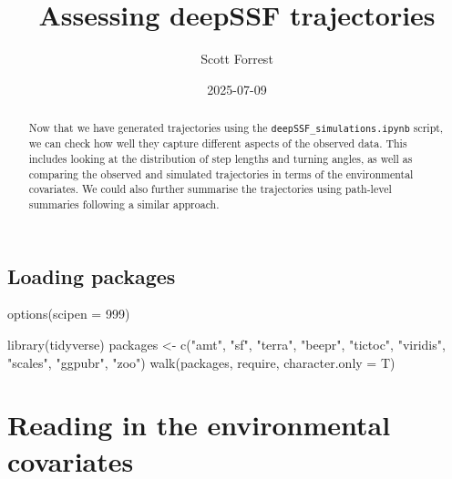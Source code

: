 \documentclass[
  letterpaper,
  DIV=11,
  numbers=noendperiod]{scrartcl}
\title{Assessing deepSSF trajectories}
\author{Scott Forrest}
\date{2025-07-09}
\newenvironment{Shaded}{\begin{snugshade}}{\end{snugshade}}
\newcommand{\AttributeTok}[1]{\textcolor[rgb]{0.40,0.45,0.13}{#1}}
\newcommand{\DecValTok}[1]{\textcolor[rgb]{0.68,0.00,0.00}{#1}}
\newcommand{\FunctionTok}[1]{\textcolor[rgb]{0.28,0.35,0.67}{#1}}
\newcommand{\NormalTok}[1]{\textcolor[rgb]{0.00,0.23,0.31}{#1}}
\newcommand{\OtherTok}[1]{\textcolor[rgb]{0.00,0.23,0.31}{#1}}
\newcommand{\StringTok}[1]{\textcolor[rgb]{0.13,0.47,0.30}{#1}}
\renewcommand*\contentsname{Table of contents}
\newcommand\contentsname{Table of contents}
\begin{document}
\maketitle
\begin{abstract}
Now that we have generated trajectories using the
\texttt{deepSSF\_simulations.ipynb} script, we can check how well they
capture different aspects of the observed data. This includes looking at
the distribution of step lengths and turning angles, as well as
comparing the observed and simulated trajectories in terms of the
environmental covariates. We could also further summarise the
trajectories using path-level summaries following a similar approach.
\end{abstract}

\renewcommand*\contentsname{Table of contents}
{
\setcounter{tocdepth}{3}
\tableofcontents
}

\subsection{Loading packages}\label{loading-packages}

\begin{Shaded}
\begin{Highlighting}[]
\FunctionTok{options}\NormalTok{(}\AttributeTok{scipen =} \DecValTok{999}\NormalTok{)}

\FunctionTok{library}\NormalTok{(tidyverse)}
\NormalTok{packages }\OtherTok{\textless{}{-}} \FunctionTok{c}\NormalTok{(}\StringTok{"amt"}\NormalTok{, }\StringTok{"sf"}\NormalTok{, }\StringTok{"terra"}\NormalTok{, }\StringTok{"beepr"}\NormalTok{, }\StringTok{"tictoc"}\NormalTok{, }\StringTok{"viridis"}\NormalTok{, }
              \StringTok{"scales"}\NormalTok{, }\StringTok{"ggpubr"}\NormalTok{, }\StringTok{"zoo"}\NormalTok{)}
\FunctionTok{walk}\NormalTok{(packages, require, }\AttributeTok{character.only =}\NormalTok{ T)}
\end{Highlighting}
\end{Shaded}

\section{Reading in the environmental
covariates}\label{reading-in-the-environmental-covariates}
\end{document}
